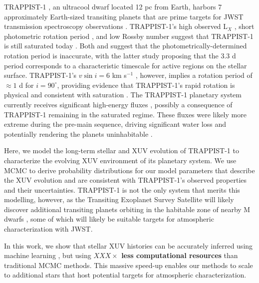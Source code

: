 \documentclass[twocolumn]{aastex62}
\def\lsim{~\rlap{$<$}{\lower 1.0ex\hbox{$\sim$}}}
\newcommand{\xxx}[1]{{\textbf{#1}}}
\newcommand{\approxposterior}[0]{\texttt{approxposterior}\xspace}
\begin{document}
TRAPPIST-1 \citep{Gillon2016,Gillon2017}, an ultracool dwarf located 12 pc from Earth, harbors 7 approximately Earth-sized transiting planets that are prime targets for JWST transmission spectroscopy observations \citep{Morley2017,Lincowski2018,Lustig2019}. TRAPPIST-1's high observed L$_{X}$ \citep{Wheatley2017}, short photometric rotation period \citep[3.3 d, ][]{Luger2017}, and low Rossby number \citep[Ro $\approx 0.01$, ][]{Roettenbacher2017} suggest that TRAPPIST-1 is still saturated today \citep{Pizzolato2003,Wright2011,Wright2018}. Both \citet{Roettenbacher2017} and \citet{Morris2018} suggest that the photometrically-determined rotation period is inaccurate, with the latter study proposing that the 3.3 d period corresponds to a characteristic timescale for active regions on the stellar surface. TRAPPIST-1's $v \sin i = 6$ km s$^{-1}$ \citep{Barnes2014}, however, implies a rotation period of $\approx 1$ d for $i = 90^{\circ}$, providing evidence that TRAPPIST-1's rapid rotation is physical and consistent with saturation \citep[$P_{rot} \lsim 20$ d,][]{Wright2018}. The TRAPPIST-1 planetary system currently receives significant high-energy fluxes \citep{Bourrier2017b,Wheatley2017,Peacock2019}, possibly a consequence of TRAPPIST-1 remaining in the saturated regime. These fluxes were likely more extreme during the pre-main sequence, driving significant water loss and potentially rendering the planets uninhabitable \citep{Bolmont2017,Bourrier2017a}. 

Here, we model the long-term stellar and XUV evolution of TRAPPIST-1 to characterize the evolving XUV environment of its planetary system. We use MCMC to derive probability distributions for our model parameters that describe the XUV evolution and are consistent with TRAPPIST-1's observed properties and their uncertainties. TRAPPIST-1 is not the only system that merits this modelling, however, as the Transiting Exoplanet Survey Satellite will likely discover additional transiting planets orbiting in the habitable zone of nearby M dwarfs \citep{Barclay2018}, some of which will likely be suitable targets for atmospheric characterization with JWST. 

In this work, we show that stellar XUV histories can be accurately inferred using machine learning \citep[\approxposterior, ][]{FlemingVanderPlas2018}, but using \xxx{$XXX\times$ less computational resources} than traditional MCMC methods. This massive speed-up enables our methods to scale to additional stars that host potential targets for atmospheric characterization. 
\end{document}
